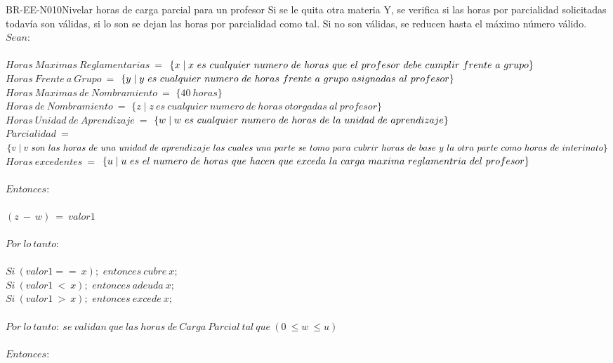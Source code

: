 \begin{BusinessRule}{BR-EE-N010}{Nivelar horas de carga parcial para un profesor}
	Si se le quita otra materia Y, se verifica si las horas por parcialidad solicitadas todavía son válidas, si lo son se dejan las horas por parcialidad como tal. Si no son válidas, se reducen hasta el máximo número válido.
	\BRItem[Sentencia]  $Sean:$ \\\\
	$Horas\ Maximas\ Reglamentarias\ =$ $\{x \mid x\ es\ cualquier\ numero\ de\ horas\ que\ el\ profesor\ debe\\\ cumplir\ frente\ a\ grupo\}$ \\
	$Horas\ Frente\ a\ Grupo\ =$ $\{y \mid y\ es\ cualquier\ numero\ de\ horas\ frente\ a\ grupo\ asignadas\ al\\\ profesor\}$ \\
	$Horas\ Maximas\ de\ Nombramiento\ =$ $\{40\ horas\}$ \\
	$Horas\ de\ Nombramiento\ =$ $\{z \mid z\ es\ cualquier\ numero\ de\ horas\ otorgadas\ al\ profesor\}$ \\
	$Horas\ Unidad\ de\ Aprendizaje\ =$ $\{w \mid w\ es\ cualquier\ numero\ de\ horas\ de\ la\ unidad\ de\\\ aprendizaje\}$ \\
	$Parcialidad\ =$ $\{v \mid v\ son\ las\ horas\ de\ una\ unidad\ de\ aprendizaje\ las\ cuales\ una\ parte\ se\\\ tomo\ para\ cubrir\ horas\ de\ base\ y\ la\ otra\ parte\ como\ horas\ de\ interinato\}$ \\
	$Horas\ excedentes\ =$ $\{u \mid u\ es\ el\ numero\ de\ horas\ que\ hacen\ que\ exceda\ la\ carga\ maxima\\\ reglamentria\ del\ profesor\}$ \\\\
	$Entonces:$ \\\\
	$(z\ -\ w)\ =\ valor1$ \\\\
	$Por\ lo\ tanto:$ \\\\
	$Si\ (valor1 ==\ x);$  $entonces\ cubre\ x;$ \\
	$Si\ (valor1\ <\ x);$  $entonces\ adeuda\ x;$ \\
	$Si\ (valor1\ >\ x);$  $entonces\ excede\ x;$ \\\\
	$Por\ lo\ tanto:\ se\ validan\ que\ las\ horas\ de\ Carga\ Parcial\ tal\ que\ (0\ \leq w\ \leq u)$\\\\
	$Entonces:$ \\\\

\end{BusinessRule}
